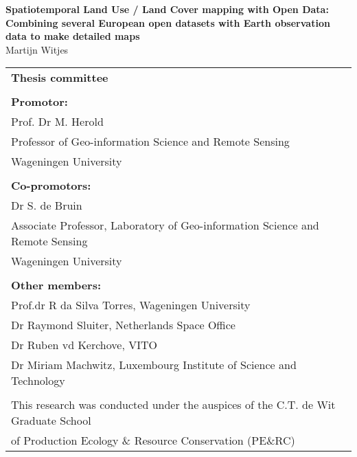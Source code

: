\thispagestyle{empty}
\begin{center}
\Huge{\textbf{Spatiotemporal Land Use / Land Cover mapping with Open Data:}} \\
\Huge{\textbf{Combining several European open datasets with Earth observation data to make detailed maps}} \\
\vspace*{1cm}
\vspace*{1cm}
\vspace*{\fill}
\large{Martijn Witjes}\\
\end{center}

\newpage
\thispagestyle{empty}
\vspace*{\fill}
\begin{tabular}{l}
    \textbf{Thesis committee}                                                                 \\  
                                                                                              \\  
    \textbf{Promotor:} \\  
    Prof. Dr M. Herold  \\  
    Professor of Geo-information Science and Remote Sensing\\  
    Wageningen University \\
    \\  
    \textbf{Co-promotors:}\\  
    Dr S. de Bruin \\  
    Associate Professor, Laboratory of Geo-information Science and Remote Sensing \\  
    Wageningen University \\  
    \\  

    \textbf{Other members:}                                                                   \\  
    Prof.dr R da Silva Torres, Wageningen University \\  
    Dr Raymond Sluiter, Netherlands Space Office \\  
    Dr Ruben vd Kerchove, VITO \\  
    Dr Miriam Machwitz, Luxembourg Institute of Science and Technology \\  \\  
    \small{This research was conducted under the auspices of the C.T. de Wit Graduate School} \\  
    \small{of Production Ecology \& Resource Conservation (PE$\&$RC)}                         \\  
\end{tabular}

